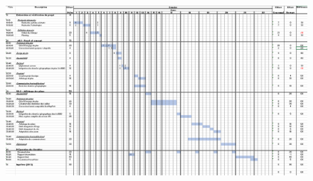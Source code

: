 \documentclass[
    iai, %
    il, %
]{heig-tb}
\begin{document}
\begin{figure}[H]
    \centering
    \includegraphics[scale=0.6, angle=90]{planning.png}
\end{figure}

\let\cleardoublepage\clearpage
\backmatter

\label{glossaire}
\printnoidxglossary
\printbibliography
\label{index}
\printindex
\end{document}
